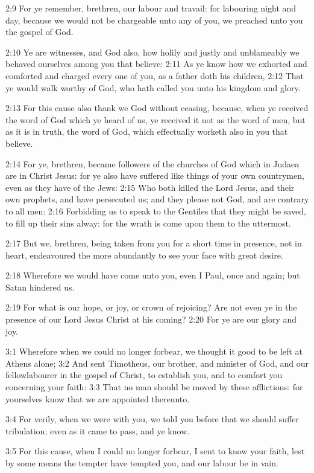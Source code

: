 2:9 For ye remember, brethren, our labour and travail: for labouring night and day, because we would not be chargeable unto any of you, we preached unto you the gospel of God.

2:10 Ye are witnesses, and God also, how holily and justly and unblameably we behaved ourselves among you that believe: 2:11 As ye know how we exhorted and comforted and charged every one of you, as a father doth his children, 2:12 That ye would walk worthy of God, who hath called you unto his kingdom and glory.

2:13 For this cause also thank we God without ceasing, because, when ye received the word of God which ye heard of us, ye received it not as the word of men, but as it is in truth, the word of God, which effectually worketh also in you that believe.

2:14 For ye, brethren, became followers of the churches of God which in Judaea are in Christ Jesus: for ye also have suffered like things of your own countrymen, even as they have of the Jews: 2:15 Who both killed the Lord Jesus, and their own prophets, and have persecuted us; and they please not God, and are contrary to all men: 2:16 Forbidding us to speak to the Gentiles that they might be saved, to fill up their sins alway: for the wrath is come upon them to the uttermost.

2:17 But we, brethren, being taken from you for a short time in presence, not in heart, endeavoured the more abundantly to see your face with great desire.

2:18 Wherefore we would have come unto you, even I Paul, once and again; but Satan hindered us.

2:19 For what is our hope, or joy, or crown of rejoicing? Are not even ye in the presence of our Lord Jesus Christ at his coming?  2:20 For ye are our glory and joy.

3:1 Wherefore when we could no longer forbear, we thought it good to be left at Athens alone; 3:2 And sent Timotheus, our brother, and minister of God, and our fellowlabourer in the gospel of Christ, to establish you, and to comfort you concerning your faith: 3:3 That no man should be moved by these afflictions: for yourselves know that we are appointed thereunto.

3:4 For verily, when we were with you, we told you before that we should suffer tribulation; even as it came to pass, and ye know.

3:5 For this cause, when I could no longer forbear, I sent to know your faith, lest by some means the tempter have tempted you, and our labour be in vain.

